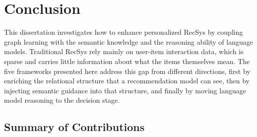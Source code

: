 \chapter{Conclusion}\label{chpt:conclusion}

This dissertation investigates how to enhance personalized RecSys by coupling graph learning with the semantic knowledge and the reasoning ability of language models. Traditional RecSys rely mainly on user-item interaction data, which is sparse and carries little information about what the items themselves mean. The five frameworks presented here address this gap from different directions, first by enriching the relational structure that a recommendation model can see, then by injecting semantic guidance into that structure, and finally by moving language model reasoning to the decision stage.

\section{Summary of Contributions}

